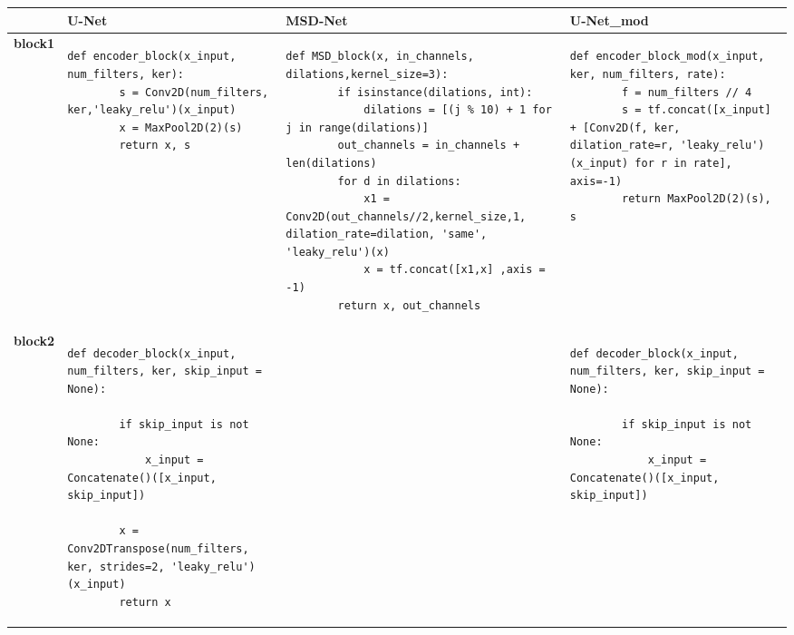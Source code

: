 \begin{table}[h!]
    \scriptsize
    \centering
    \begin{tabular}{|>{\centering\arraybackslash\bfseries}p{1.2cm}|p{4.5cm}|p{4.5cm}|p{4.5cm}|}
    \hline
     & \textbf{U-Net} & \textbf{MSD-Net} & \textbf{U-Net\_mod} \\ \hline
    block1 & 
    \begin{lstlisting}[basicstyle=\tiny\ttfamily, xleftmargin=-1em]
    def encoder_block(x_input, num_filters, ker):
        s = Conv2D(num_filters, ker,'leaky_relu')(x_input)
        x = MaxPool2D(2)(s)
        return x, s
    \end{lstlisting} 
    & \begin{lstlisting}[basicstyle=\tiny\ttfamily, xleftmargin=-1em]
    def MSD_block(x, in_channels, dilations,kernel_size=3):  
        if isinstance(dilations, int):  
            dilations = [(j % 10) + 1 for j in range(dilations)]  
        out_channels = in_channels + len(dilations)  
        for d in dilations:  
            x1 = Conv2D(out_channels//2,kernel_size,1, dilation_rate=dilation, 'same', 'leaky_relu')(x)
            x = tf.concat([x1,x] ,axis = -1)
        return x, out_channels
    \end{lstlisting} 
    &
    \begin{lstlisting}[basicstyle=\tiny\ttfamily, xleftmargin=-1em]
    def encoder_block_mod(x_input, ker, num_filters, rate):
        f = num_filters // 4
        s = tf.concat([x_input] + [Conv2D(f, ker, dilation_rate=r, 'leaky_relu')(x_input) for r in rate], axis=-1)
        return MaxPool2D(2)(s), s
    \end{lstlisting} \\ \hline
    block2 
    &
    \begin{lstlisting}[basicstyle=\tiny\ttfamily, xleftmargin=-1em]
    def decoder_block(x_input, num_filters, ker, skip_input = None):
    
        if skip_input is not None:
            x_input = Concatenate()([x_input, skip_input])
            
        x = Conv2DTranspose(num_filters, ker, strides=2, 'leaky_relu')(x_input)
        return x
    \end{lstlisting} 
    & 
    &
    \begin{lstlisting}[basicstyle=\tiny\ttfamily, xleftmargin=-1em]
    def decoder_block(x_input, num_filters, ker, skip_input = None):
    
        if skip_input is not None:
            x_input = Concatenate()([x_input, skip_input])
            

\end{lstlisting}
\end{tabular}
\end{table}
